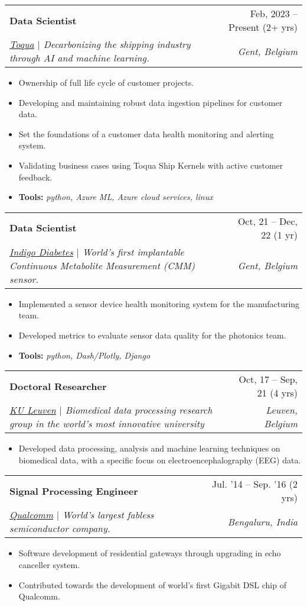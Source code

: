 \documentclass[letterpaper,11pt]{article}
\makeatletter
\newcommand{\resumeItem}[1]{
  \item\small{
    {#1 \vspace{-2pt}}
  }
}
\newcommand{\resumeSubheading}[4]{
  \vspace{-2pt}\item
    \begin{tabular*}{0.97\textwidth}[t]{l@{\extracolsep{\fill}}r}
      \textbf{#1} & #2 \\
      \textit{\small#3} & \textit{\small #4} \\
    \end{tabular*}\vspace{-7pt}
}
\newcommand{\resumeSubSubheading}[2]{
    \item
    \begin{tabular*}{0.97\textwidth}{l@{\extracolsep{\fill}}r}
      \textit{\small#1} & \textit{\small #2} \\
    \end{tabular*}\vspace{-7pt}
}
\newcommand{\resumeSubHeadingListEnd}{\end{itemize}}
\newcommand{\resumeItemListStart}{\begin{itemize}}
\newcommand{\resumeItemListEnd}{\end{itemize}\vspace{-5pt}}
\makeatother
\begin{document}
    \resumeSubheading
      {Data Scientist}{Feb, 2023 -- Present (2+ yrs)}
      {\href{https://toqua.ai}{\underline{Toqua}} $|$ \emph{Decarbonizing the shipping industry through AI and machine learning.}}{Gent, Belgium}
      \resumeItemListStart
        \resumeItem{Ownership of full life cycle of customer projects.}
        \resumeItem{Developing and maintaining robust data ingestion pipelines for customer data.}
        \resumeItem{Set the foundations of a customer data health monitoring and alerting system.}
        \resumeItem{Validating business cases using Toqua Ship Kernels with active customer feedback.}
        \resumeItem{\textbf{Tools:} \emph{python, Azure ML, Azure cloud services, linux}}
      \resumeItemListEnd

    \resumeSubheading
      {Data Scientist}{Oct, 21 -- Dec, 22 (1 yr)}
      {\href{https://indigomed.com/}{\underline{Indigo Diabetes}} $|$ \emph{World’s first implantable Continuous Metabolite Measurement (CMM) sensor.}}
      {Gent, Belgium}
      \resumeItemListStart
        \resumeItem{Implemented a sensor device health monitoring system for the manufacturing team.}
        \resumeItem{Developed metrics to evaluate sensor data quality for the photonics team.}
        \resumeItem{\textbf{Tools:} \emph{python, Dash/Plotly, Django}}
      \resumeItemListEnd

    \resumeSubheading
      {Doctoral Researcher}{Oct, 17 -- Sep, 21 (4 yrs)}
      {\href{https://www.kuleuven.be/}{\underline{KU Leuven}} $|$ \emph{Biomedical data processing research group in the world’s most innovative university}}{Leuven, Belgium}
      \resumeItemListStart
        \resumeItem{Developed data processing, analysis and machine learning techniques on biomedical data, with a specific focus on electroencephalography (EEG) data.}
      \resumeItemListEnd
    
   \resumeSubheading
      {Signal Processing Engineer}{Jul. '14 -- Sep. '16 (2 yrs)}
      {\href{https://www.qualcomm.com/}{\underline{Qualcomm}} $|$ \emph{World’s largest fabless semiconductor company.}}
      {Bengaluru, India}
      \resumeItemListStart
        \resumeItem{Software development of residential gateways through upgrading in echo canceller system.}
        \resumeItem{Contributed towards the development of world’s first Gigabit DSL chip of Qualcomm.}
      \resumeItemListEnd
      
\end{document}
